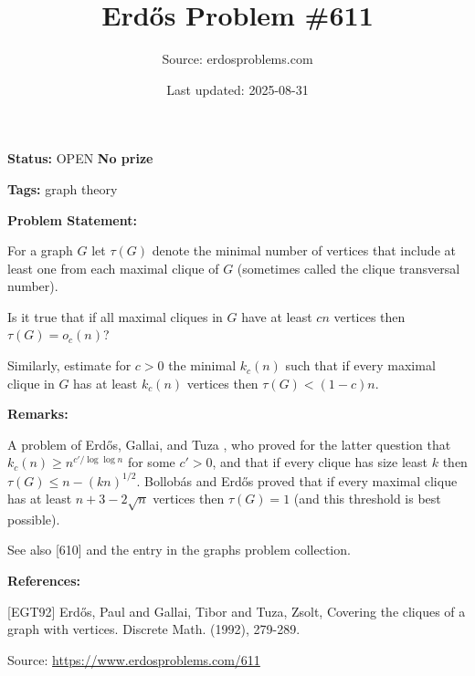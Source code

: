 \documentclass{article}
\title{Erd\H{o}s Problem \#611}
\date{Last updated: 2025-08-31}
\author{Source: erdosproblems.com}
\begin{document}
\maketitle

\noindent\textbf{Status:} OPEN \quad \textbf{No prize}

\noindent\textbf{Tags:} graph theory

\medskip
\noindent\textbf{Problem Statement:}

For a graph $G$ let $\tau(G)$ denote the minimal number of vertices that include at least one from each maximal clique of $G$ (sometimes called the clique transversal number).

Is it true that if all maximal cliques in $G$ have at least $cn$ vertices then $\tau(G)=o_c(n)$?

Similarly, estimate for $c>0$ the minimal $k_c(n)$ such that if every maximal clique in $G$ has at least $k_c(n)$ vertices then $\tau(G)<(1-c)n$.

\bigskip
\noindent\textbf{Remarks:}

A problem of Erd\H{o}s, Gallai, and Tuza \cite{EGT92}, who proved for the latter question that $k_c(n) \geq n^{c'/\log\log n}$ for some $c'>0$, and that if every clique has size least $k$ then $\tau(G) \leq n-(kn)^{1/2}$. Bollob\'{a}s and Erd\H{o}s proved that if every maximal clique has at least $n+3-2\sqrt{n}$ vertices then $\tau(G)=1$ (and this threshold is best possible).

See also [610] and the entry in the graphs problem collection.

\bigskip
\noindent\textbf{References:}

[EGT92] Erd\H{o}s, Paul and Gallai, Tibor and Tuza, Zsolt, Covering the cliques of a graph with vertices. Discrete Math. (1992), 279-289.

\bigskip
\noindent\small{Source: \url{https://www.erdosproblems.com/611}}
\end{document}
